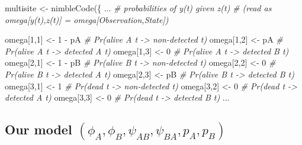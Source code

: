 \documentclass[
  12pt,
]{krantz}
\newenvironment{Shaded}{\begin{snugshade}}{\end{snugshade}}
\newcommand{\CommentTok}[1]{\textcolor[rgb]{0.56,0.35,0.01}{\textit{#1}}}
\newcommand{\DecValTok}[1]{\textcolor[rgb]{0.00,0.00,0.81}{#1}}
\newcommand{\FunctionTok}[1]{\textcolor[rgb]{0.00,0.00,0.00}{#1}}
\newcommand{\NormalTok}[1]{#1}
\newcommand{\OtherTok}[1]{\textcolor[rgb]{0.56,0.35,0.01}{#1}}
\newcommand{\SpecialCharTok}[1]{\textcolor[rgb]{0.00,0.00,0.00}{#1}}
\begin{document}
\begin{Shaded}
\begin{Highlighting}[]
\NormalTok{multisite }\OtherTok{\textless{}{-}} \FunctionTok{nimbleCode}\NormalTok{(\{}
\NormalTok{...}
  \CommentTok{\# probabilities of y(t) given z(t)}
  \CommentTok{\# (read as omega[y(t),z(t)] = omega[Observation,State])}

\NormalTok{  omega[}\DecValTok{1}\NormalTok{,}\DecValTok{1}\NormalTok{] }\OtherTok{\textless{}{-}} \DecValTok{1} \SpecialCharTok{{-}}\NormalTok{ pA     }\CommentTok{\# Pr(alive A t {-}\textgreater{} non{-}detected t)}
\NormalTok{  omega[}\DecValTok{1}\NormalTok{,}\DecValTok{2}\NormalTok{] }\OtherTok{\textless{}{-}}\NormalTok{ pA         }\CommentTok{\# Pr(alive A t {-}\textgreater{} detected A t)}
\NormalTok{  omega[}\DecValTok{1}\NormalTok{,}\DecValTok{3}\NormalTok{] }\OtherTok{\textless{}{-}} \DecValTok{0}          \CommentTok{\# Pr(alive A t {-}\textgreater{} detected B t)}
\NormalTok{  omega[}\DecValTok{2}\NormalTok{,}\DecValTok{1}\NormalTok{] }\OtherTok{\textless{}{-}} \DecValTok{1} \SpecialCharTok{{-}}\NormalTok{ pB     }\CommentTok{\# Pr(alive B t {-}\textgreater{} non{-}detected t)}
\NormalTok{  omega[}\DecValTok{2}\NormalTok{,}\DecValTok{2}\NormalTok{] }\OtherTok{\textless{}{-}} \DecValTok{0}          \CommentTok{\# Pr(alive B t {-}\textgreater{} detected A t)}
\NormalTok{  omega[}\DecValTok{2}\NormalTok{,}\DecValTok{3}\NormalTok{] }\OtherTok{\textless{}{-}}\NormalTok{ pB         }\CommentTok{\# Pr(alive B t {-}\textgreater{} detected B t)}
\NormalTok{  omega[}\DecValTok{3}\NormalTok{,}\DecValTok{1}\NormalTok{] }\OtherTok{\textless{}{-}} \DecValTok{1}          \CommentTok{\# Pr(dead t {-}\textgreater{} non{-}detected t)}
\NormalTok{  omega[}\DecValTok{3}\NormalTok{,}\DecValTok{2}\NormalTok{] }\OtherTok{\textless{}{-}} \DecValTok{0}          \CommentTok{\# Pr(dead t {-}\textgreater{} detected A t)}
\NormalTok{  omega[}\DecValTok{3}\NormalTok{,}\DecValTok{3}\NormalTok{] }\OtherTok{\textless{}{-}} \DecValTok{0}          \CommentTok{\# Pr(dead t {-}\textgreater{} detected B t)}
\NormalTok{...}
\end{Highlighting}
\end{Shaded}

\hypertarget{our-model-phi_a-phi_b-psi_ab-psi_ba-p_a-p_b-5}{%
\subsection{\texorpdfstring{Our model \((\phi_A, \phi_B, \psi_{AB}, \psi_{BA}, p_A, p_B)\)}{Our model (\textbackslash phi\_A, \textbackslash phi\_B, \textbackslash psi\_\{AB\}, \textbackslash psi\_\{BA\}, p\_A, p\_B)}}\label{our-model-phi_a-phi_b-psi_ab-psi_ba-p_a-p_b-5}}
\end{document}
